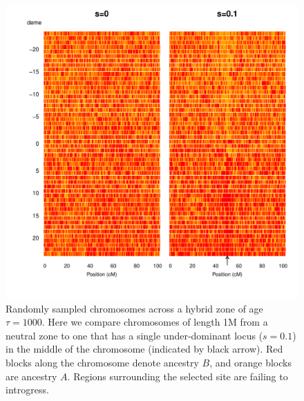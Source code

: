 \documentclass[12pt]{article}
\begin{document}



\begin{figure}
\includegraphics[width=\textwidth]{figs/plot_chromosomes_tau1000}
\caption{Randomly sampled chromosomes  across a hybrid zone of age $\tau=1000$. Here we compare chromosomes of length 1M from a neutral zone to one that has a single under-dominant locus ($s=0.1$) in the middle of the chromosome (indicated by black arrow). Red blocks along the chromosome denote ancestry $B$, and orange blocks are ancestry $A$. Regions surrounding the selected site are failing to introgress.
 }\label{Fig:resistanceToIntrogression1000g}
\end{figure}
\end{document}
